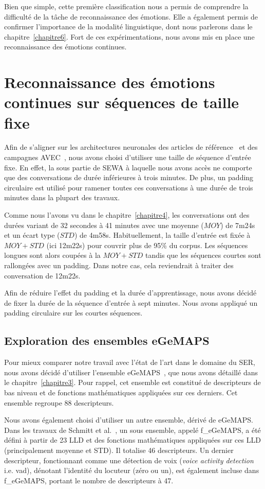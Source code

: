 Bien que simple, cette première classification nous a permis de comprendre la difficulté de la tâche de reconnaissance des émotions. Elle a également permis de confirmer l'importance de la modalité linguistique, dont nous parlerons dans le chapitre~\ref{chapitre6}. Fort de ces expérimentations, nous avons mis en place une reconnaissance des émotions continues.

\section{Reconnaissance des émotions continues sur séquences de taille fixe}
Afin de s'aligner sur les architectures neuronales des articles de référence~\cite{Schmitt2019,SEWA} et des campagnes AVEC~\cite{AVEC2017,AVEC2018,AVEC2019}, nous avons choisi d'utiliser une taille de séquence d'entrée fixe. En effet, la sous partie de SEWA à laquelle nous avons accès ne comporte que des conversations de durée inférieures à trois minutes. De plus, un padding circulaire est utilisé pour ramener toutes ces conversations à une durée de trois minutes dans la plupart des travaux.

Comme nous l'avons vu dans le chapitre~\ref{chapitre4}, les conversations ont des durées variant de 32 secondes à 41 minutes avec une moyenne ($MOY$) de 7m24s et un écart type ($STD$) de 4m58s. Habituellement, la taille d'entrée est fixée à $MOY + STD$ (ici 12m22s) pour couvrir plus de 95\% du corpus. Les séquences longues sont alors coupées à la $MOY + STD$ tandis que les séquences courtes sont rallongées avec un padding. Dans notre cas, cela reviendrait à traiter des conversation de 12m22s.

Afin de réduire l'effet du padding et la durée d'apprentissage, nous avons décidé de fixer la durée de la séquence d'entrée à sept minutes. Nous avons appliqué un padding circulaire sur les courtes séquences.

\subsection{Exploration des ensembles eGeMAPS}
Pour mieux comparer notre travail avec l'état de l'art dans le domaine du SER, nous avons décidé d'utiliser l'ensemble eGeMAPS~\cite{Eyben2016}, que nous avons détaillé dans le chapitre~\ref{chapitre3}. Pour rappel, cet ensemble est constitué de descripteurs de bas niveau et de fonctions mathématiques appliquées sur ces derniers. Cet ensemble regroupe 88 descripteurs.

Nous avons également choisi d'utiliser un autre ensemble, dérivé de eGeMAPS. Dans les travaux de Schmitt et al.~\cite{Schmitt2019}, un sous ensemble, appelé f\_eGeMAPS, a été défini à partir de 23 LLD et des fonctions mathématiques appliquées sur ces LLD (principalement moyenne et STD). Il totalise 46 descripteurs. Un dernier descripteur, fonctionnant comme une détection de voix (\textit{voice activity detection} i.e. vad), dénotant l'identité du locuteur (zéro ou un), est également incluse dans f\_eGeMAPS, portant le nombre de descripteurs à 47.


